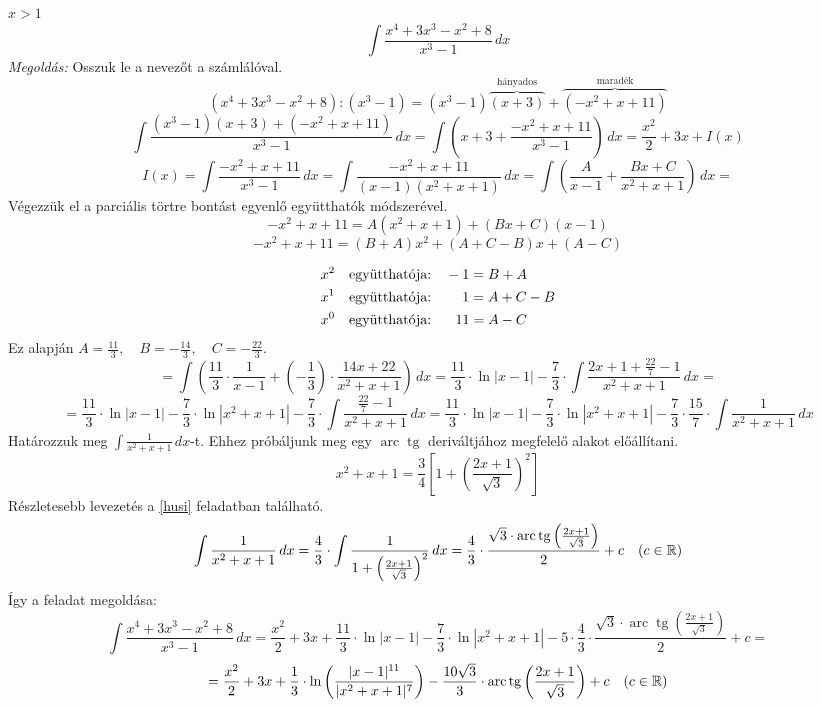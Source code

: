 \documentclass[a4paper,11.5pt]{article}
\DeclareMathOperator{\tg}{tg}
\DeclareMathOperator{\arc}{arc}
\begin{document}
	\begin{exercise}$x>1$
		\[\int\frac{x^4+3x^3-x^2+8}{x^3-1}\,dx  \] 
		\textit{Megoldás:}
		Osszuk le a nevezőt a számlálóval.
		\[ (x^4+3x^3-x^2+8):(x^3-1)=(x^3-1)\overbrace{(x+3)}^{\text{hányados}}+\overbrace{(-x^2+x+11)}^{\text{maradék}} \]
		\[\int\frac{(x^3-1)(x+3)+(-x^2+x+11)}{x^3-1}\,dx=\int\left(x+3+\frac{-x^2+x+11}{x^3-1}\right)\,dx=\frac{x^2}{2}+3x+I(x) \]
		\[ I(x)=\int\frac{-x^2+x+11}{x^3-1}\,dx=\int\frac{-x^2+x+11}{(x-1)(x^2+x+1)}\,dx=\int\left(\frac{A}{x-1}+\frac{Bx+C}{x^2+x+1}\right)\,dx= \]
		Végezzük el a parciális törtre bontást egyenlő együtthatók módszerével.
		\[ -x^2+x+11=A(x^2+x+1)+(Bx+C)(x-1) \]
		\[ -x^2+x+11=(B+A)x^2+(A+C-B)x+(A-C) \]
		
		\vspace{-7mm}
		\begin{align*}
			x^2 \quad \text{együtthatója:}&\quad          -1=B+A\\
			x^1 \quad \text{együtthatója:}&\hspace{7.8mm}  1=A+C-B\\
			x^0 \quad \text{együtthatója:}&\hspace{6.1mm}  11=A-C
		\end{align*}
		Ez alapján $A= \frac{11}{3},\quad B=-\frac{14}{3},\quad C=-\frac{22}{3}.$
		\[=\int\left(\frac{11}{3}\cdot\frac{1}{x-1}+\left(-\frac{1}{3}\right)\cdot\frac{14x+22}{x^2+x+1}\right)\,dx=\frac{11}{3}\cdot\ln|x-1|-\frac{7}{3}\cdot\int\frac{2x+1+\frac{22}{7}-1}{x^2+x+1}\,dx= \]
		\[ =\frac{11}{3}\cdot\ln|x-1|-\frac{7}{3}\cdot\ln|x^2+x+1|-\frac{7}{3}\cdot\int\frac{\frac{22}{7}-1}{x^2+x+1}\,dx=\frac{11}{3}\cdot\ln|x-1|-\frac{7}{3}\cdot\ln|x^2+x+1|-\frac{7}{3}\cdot\frac{15}{7}\cdot\int\frac{1}{x^2+x+1}\,dx \]
		Határozzuk meg $\int\frac{1}{x^2+x+1}\,dx$-t. Ehhez próbáljunk meg egy $\arc\tg$ deriváltjához megfelelő alakot előállítani.
		\[ x^2+x+1=\frac{3}{4}\left[1+\left(\frac{2x+1}{\sqrt{3}}\right)^2\right] \]
		Részletesebb levezetés a \ref{husi} feladatban található.
		\[ \int\frac{1}{x^2+x+1}\,dx=\frac{4}{3}\cdot\int\frac{1}{1+\left(\frac{2x+1}{\sqrt{3}}\right)^2}\,dx=\frac{4}{3}\cdot\frac{\sqrt{3}\cdot\arc\tg\left(\frac{2x+1}{\sqrt{3}}\right)}{2}+c\quad (c\in\R)  \]
		Így a feladat megoldása:
		\[ \int\frac{x^4+3x^3-x^2+8}{x^3-1}\,dx =\frac{x^2}{2}+3x+ \frac{11}{3}\cdot\ln|x-1|-\frac{7}{3}\cdot\ln|x^2+x+1|-5\cdot\frac{4}{3}\cdot\frac{\sqrt{3}\cdot\arc\tg\left(\frac{2x+1}{\sqrt{3}}\right)}{2}+c= \]
		\[=\frac{x^2}{2}+3x+ \frac{1}{3}\cdot\ln\left(\frac{|x-1|^{11}}{|x^2+x+1|^7}\right)-\frac{10\sqrt{3}}{3}\cdot\arc\tg\left(\frac{2x+1}{\sqrt{3}}\right)+c\quad (c\in\R)\]
	\end{exercise}
\end{document}

